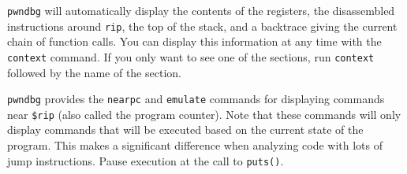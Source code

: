 \documentclass{article}
\begin{document}
\texttt{pwndbg} will automatically display the contents of the registers, the
disassembled instructions around \texttt{rip}, the top of the stack, and a
backtrace giving the current chain of function calls. You can display this
information at any time with the \texttt{context} command. If you only want to
see one of the sections, run \texttt{context} followed by the name of the
section.

\texttt{pwndbg} provides the \texttt{nearpc} and \texttt{emulate} commands for
displaying commands near \texttt{\$rip} (also called the program counter).
Note that these commands will only display commands that will be executed based
on the current state of the program. This makes a significant difference when
analyzing code with lots of jump instructions. Pause execution at the call to
\texttt{puts()}.
\end{document}
